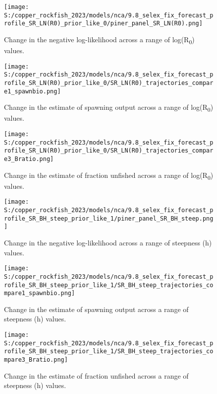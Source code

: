 \documentclass[11pt,
  english,
  letterpaper,
]{article}
\begin{document}
\begin{figure}
\centering
\texttt{[image: S:/copper\_rockfish\_2023/models/nca/9.8\_selex\_fix\_forecast\_profile\_SR\_LN(R0)\_prior\_like\_0/piner\_panel\_SR\_LN(R0).png]}
\caption{Change in the negative log-likelihood across a range of log(R\textsubscript{0}) values.\label{fig:r0-profile}}
\end{figure}

\pagebreak

\begin{figure}
\centering
\texttt{[image: S:/copper\_rockfish\_2023/models/nca/9.8\_selex\_fix\_forecast\_profile\_SR\_LN(R0)\_prior\_like\_0/SR\_LN(R0)\_trajectories\_compare1\_spawnbio.png]}
\caption{Change in the estimate of spawning output across a range of log(R\textsubscript{0}) values.\label{fig:r0-ssb}}
\end{figure}

\pagebreak

\begin{figure}
\centering
\texttt{[image: S:/copper\_rockfish\_2023/models/nca/9.8\_selex\_fix\_forecast\_profile\_SR\_LN(R0)\_prior\_like\_0/SR\_LN(R0)\_trajectories\_compare3\_Bratio.png]}
\caption{Change in the estimate of fraction unfished across a range of log(R\textsubscript{0}) values.\label{fig:r0-depl}}
\end{figure}

\pagebreak

\begin{figure}
\centering
\texttt{[image: S:/copper\_rockfish\_2023/models/nca/9.8\_selex\_fix\_forecast\_profile\_SR\_BH\_steep\_prior\_like\_1/piner\_panel\_SR\_BH\_steep.png]}
\caption{Change in the negative log-likelihood across a range of steepness (h) values.\label{fig:h-profile}}
\end{figure}

\pagebreak

\begin{figure}
\centering
\texttt{[image: S:/copper\_rockfish\_2023/models/nca/9.8\_selex\_fix\_forecast\_profile\_SR\_BH\_steep\_prior\_like\_1/SR\_BH\_steep\_trajectories\_compare1\_spawnbio.png]}
\caption{Change in the estimate of spawning output across a range of steepness (h) values.\label{fig:h-ssb}}
\end{figure}

\pagebreak

\begin{figure}
\centering
\texttt{[image: S:/copper\_rockfish\_2023/models/nca/9.8\_selex\_fix\_forecast\_profile\_SR\_BH\_steep\_prior\_like\_1/SR\_BH\_steep\_trajectories\_compare3\_Bratio.png]}
\caption{Change in the estimate of fraction unfished across a range of steepness (h) values.\label{fig:h-depl}}
\end{figure}
\end{document}
